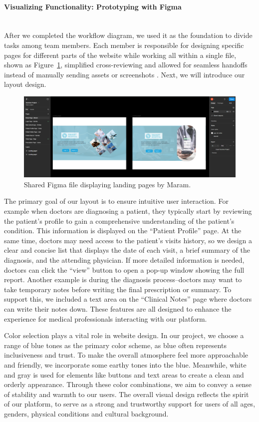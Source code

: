 \paragraph{Visualizing Functionality: Prototyping with Figma}\mbox{}\\
After we completed the workflow diagram, we used it as the foundation to divide tasks among team members. Each member is responsible for designing specific pages for different parts of the website while working all within a single file, shown as Figure~\ref{fig:3-2-2-DS-figma-f1}, simplified cross-reviewing and allowed for seamless handoffs instead of manually sending assets or screenshots . Next, we will introduce our layout design.
\begin{figure}[H]
  \centering
  \includegraphics[width=0.8\linewidth]{images03/3-2-2-figure1.png} 
  \caption{Shared Figma file displaying landing pages by Maram.}
  \label{fig:3-2-2-DS-figma-f1}
\end{figure}

The primary goal of our layout is to ensure intuitive user interaction. For example when doctors are diagnosing a patient, they typically start by reviewing the patient’s profile to gain a comprehensive understanding of the patient’s condition. This information is displayed on the “Patient Profile” page. At the same time, doctors may need access to the patient’s visits history, so we design a clear and concise list that displays the date of each visit, a brief summary of the diagnosis, and the attending physician. If more detailed information is needed, doctors can click the “view” button to open a pop-up window showing the full report. Another example is during the diagnosis process–doctors may want to take temporary notes before writing the final prescription or summary. To support this, we included a text area on the “Clinical Notes” page where doctors can write their notes down. These features are all designed to enhance the experience for medical professionals interacting with our platform.

Color selection plays a vital role in website design. In our project, we choose a range of blue tones as the primary color scheme, as blue often represents inclusiveness and trust. To make the overall atmosphere feel more approachable and friendly, we incorporate some earthy tones into the blue. Meanwhile, white and gray is used for  elements like buttons and text areas to create a clean and orderly appearance. Through these color combinations, we aim to convey a sense of stability and warmth to our users. The overall visual design reflects the spirit of our platform, to serve as a strong and trustworthy support for users of all ages, genders, physical conditions and cultural background.

